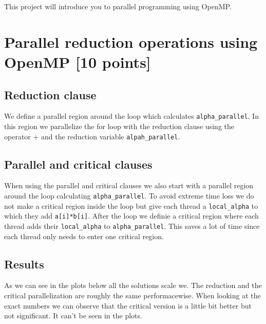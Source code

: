 \documentclass[unicode,11pt,a4paper,oneside,numbers=endperiod,openany]{scrartcl}
\begin{document}
\setassignment
{}

\newline

\assignmentpolicy
This project will introduce you to parallel programming using OpenMP.


\section{Parallel reduction operations using OpenMP [10 points]}

\subsection{Reduction clause}
We define a parallel region around the loop which calculates \texttt{alpha\_parallel}.
In this region we parallelize the for loop with the reduction clause using the operator + and the reduction variable \texttt{alpah\_parallel}.

\subsection{Parallel and critical clauses}
When using the parallel and critical clauses we also start with a parallel region around the loop calculating \texttt{alpha\_parallel}.
To avoid extreme time loss we do not make a critical region inside the loop but give each thread a \texttt{local\_alpha} to which they add \texttt{a[i]*b[i]}.
After the loop we definie a critical region where each thread adds their \texttt{local\_alpha} to \texttt{alpha\_parallel}.
This saves a lot of time since each thread only needs to enter one critical region.
\subsection{Results}


As we can see in the plots below all the solutions scale we. The reduction and the critical parallelization are roughly the same performacewise.
When looking at the exact numbers we can observe that the critical version is a little bit better but not significant. It can't be seen in the plots.
\end{document}
